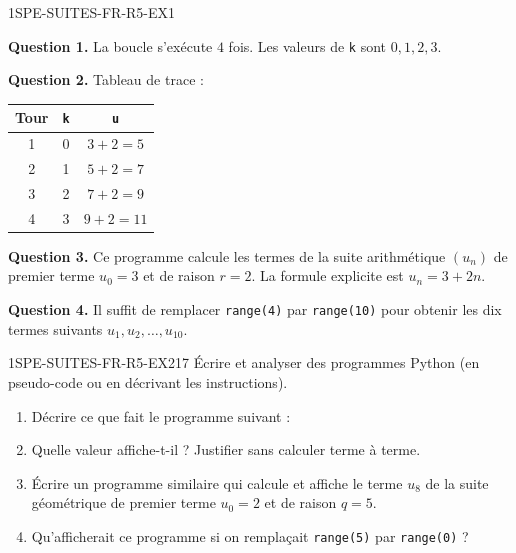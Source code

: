 \begin{corrige}{1SPE-SUITES-FR-R5-EX1}


\textbf{Question 1.} La boucle s'exécute $4$ fois. Les valeurs de \verb|k| sont $0, 1, 2, 3$.

\textbf{Question 2.} Tableau de trace :

\begin{center}
\begin{tabular}{|c|c|c|}
\hline
Tour & \verb|k| & \verb|u| \\
\hline
1 & 0 & $3 + 2 = 5$ \\
2 & 1 & $5 + 2 = 7$ \\
3 & 2 & $7 + 2 = 9$ \\
4 & 3 & $9 + 2 = 11$ \\
\hline
\end{tabular}
\end{center}


\textbf{Question 3.} Ce programme calcule les termes de la suite arithmétique $(u_n)$ de premier terme $u_0 = 3$ et de raison $r = 2$. La formule explicite est $u_n = 3 + 2n$.

\textbf{Question 4.} Il suffit de remplacer \verb|range(4)| par \verb|range(10)| pour obtenir les dix termes suivants $u_1, u_2, \ldots, u_{10}$.

\end{corrige}


\begin{exercice}{1SPE-SUITES-FR-R5-EX2}{1}{7}
Écrire et analyser des programmes Python (en pseudo-code ou en décrivant les instructions).

\begin{enumerate}
  \item Décrire ce que fait le programme suivant :

\medskip


  \item Quelle valeur affiche-t-il ? Justifier sans calculer terme à terme.
  \item Écrire un programme similaire qui calcule et affiche le terme $u_8$ de la suite géométrique de premier terme $u_0 = 2$ et de raison $q = 5$.
  \item Qu'afficherait ce programme si on remplaçait \texttt{range(5)} par \texttt{range(0)} ?
\end{enumerate}
\end{exercice}

